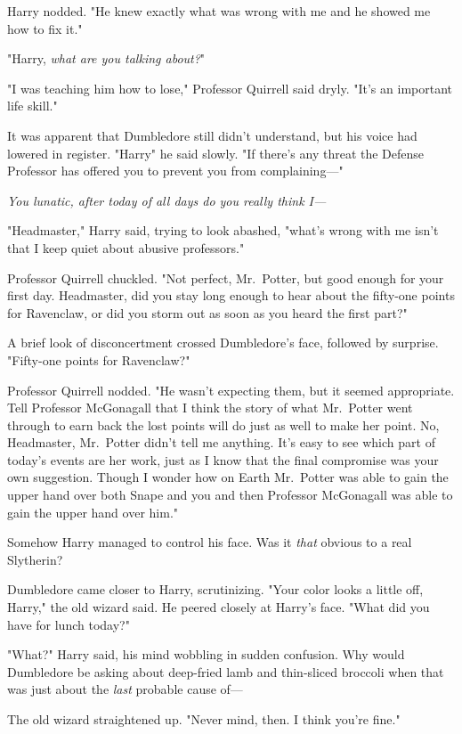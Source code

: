 Harry nodded. "He knew exactly what was wrong with me and he showed me how to
fix it."

"Harry, \emph{what are you talking about?}"

"I was teaching him how to lose," Professor Quirrell said dryly. "It's an
important life skill."

It was apparent that Dumbledore still didn't understand, but his voice had
lowered in register. "Harry{\el}" he said slowly. "If there's any threat the
Defense Professor has offered you to prevent you from complaining\mbox{---}"

\emph{You lunatic, after today of all days do you really think I---}

"Headmaster," Harry said, trying to look abashed, "what's wrong with me isn't
that I keep quiet about abusive professors."

Professor Quirrell chuckled. "Not perfect, Mr.~Potter, but good enough for your
first day. Headmaster, did you stay long enough to hear about the fifty-one
points for Ravenclaw, or did you storm out as soon as you heard the first part?"

A brief look of disconcertment crossed Dumbledore's face, followed by surprise.
"Fifty-one points for Ravenclaw?"

Professor Quirrell nodded. "He wasn't expecting them, but it seemed
appropriate. Tell Professor McGonagall that I think the story of what
Mr.~Potter went through to earn back the lost points will do just as well to
make her point. No, Headmaster, Mr.~Potter didn't tell me anything. It's easy
to see which part of today's events are her work, just as I know that the final
compromise was your own suggestion. Though I wonder how on Earth Mr.~Potter was
able to gain the upper hand over both Snape and you and then Professor
McGonagall was able to gain the upper hand over him."

Somehow Harry managed to control his face. Was it \emph{that} obvious to a real
Slytherin?

Dumbledore came closer to Harry, scrutinizing. "Your color looks a little off,
Harry," the old wizard said. He peered closely at Harry's face. "What did you
have for lunch today?"

"What?" Harry said, his mind wobbling in sudden confusion. Why would Dumbledore
be asking about deep-fried lamb and thin-sliced broccoli when that was just
about the \emph{last} probable cause of---

The old wizard straightened up. "Never mind, then. I think you're fine."

